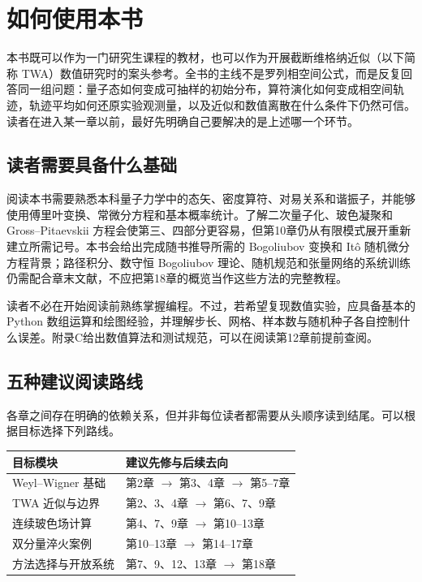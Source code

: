 \chapter*{如何使用本书}

本书既可以作为一门研究生课程的教材，也可以作为开展截断维格纳近似（以下简称 TWA）数值研究时的案头参考。全书的主线不是罗列相空间公式，而是反复回答同一组问题：量子态如何变成可抽样的初始分布，算符演化如何变成相空间轨迹，轨迹平均如何还原实验观测量，以及近似和数值离散在什么条件下仍然可信。读者在进入某一章以前，最好先明确自己要解决的是上述哪一个环节。

\section*{读者需要具备什么基础}

阅读本书需要熟悉本科量子力学中的态矢、密度算符、对易关系和谐振子，并能够使用傅里叶变换、常微分方程和基本概率统计。了解二次量子化、玻色凝聚和 Gross--Pitaevskii 方程会使第三、四部分更容易，但第10章仍从有限模式展开重新建立所需记号。本书会给出完成随书推导所需的 Bogoliubov 变换和 It\^o 随机微分方程背景；路径积分、数守恒 Bogoliubov 理论、随机规范和张量网络的系统训练仍需配合章末文献，不应把第18章的概览当作这些方法的完整教程。

读者不必在开始阅读前熟练掌握编程。不过，若希望复现数值实验，应具备基本的 Python 数组运算和绘图经验，并理解步长、网格、样本数与随机种子各自控制什么误差。附录C给出数值算法和测试规范，可以在阅读第12章前提前查阅。

\section*{五种建议阅读路线}

各章之间存在明确的依赖关系，但并非每位读者都需要从头顺序读到结尾。可以根据目标选择下列路线。

\begin{center}
\begin{tabularx}{\textwidth}{p{}X}
\toprule
目标模块 & 建议先修与后续去向 \\
\midrule
Weyl--Wigner 基础 & 第2章 $\rightarrow$ 第3、4章 $\rightarrow$ 第5--7章 \\
TWA 近似与边界 & 第2、3、4章 $\rightarrow$ 第6、7、9章 \\
连续玻色场计算 & 第4、7、9章 $\rightarrow$ 第10--13章 \\
双分量淬火案例 & 第10--13章 $\rightarrow$ 第14--17章 \\
方法选择与开放系统 & 第7、9、12、13章 $\rightarrow$ 第18章 \\
\bottomrule
\end{tabularx}
\end{center}

